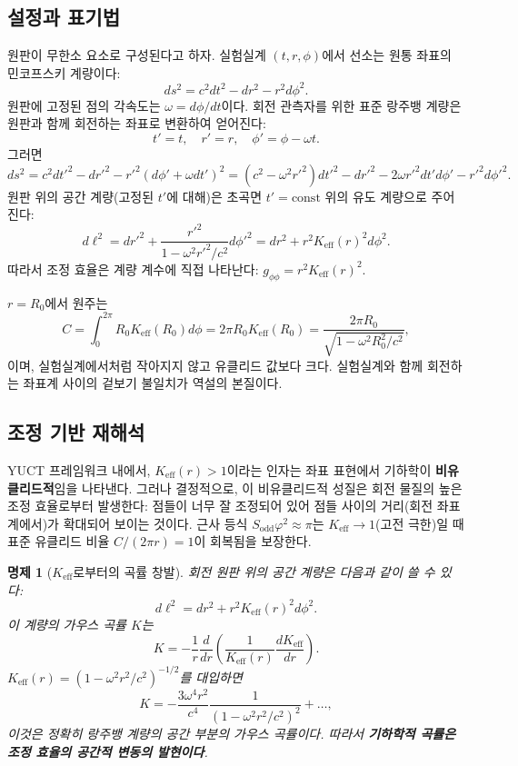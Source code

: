 \documentclass[12pt,a4paper]{article}
\newtheorem{proposition}{명제}[section]
\newcommand{\Sodd}{S_{\mathrm{odd}}}
\begin{document}
	\subsection{설정과 표기법}
	원판이 무한소 요소로 구성된다고 하자. 실험실계 \((t, r, \phi)\)에서 선소는 원통 좌표의 민코프스키 계량이다:
	\[
	ds^2 = c^2 dt^2 - dr^2 - r^2 d\phi^2.
	\]
	원판에 고정된 점의 각속도는 \(\omega = d\phi/dt\)이다. 회전 관측자를 위한 표준 랑주뱅 계량은 원판과 함께 회전하는 좌표로 변환하여 얻어진다:
	\[
	t' = t,\quad r' = r,\quad \phi' = \phi - \omega t.
	\]
	그러면
	\[
	ds^2 = c^2 dt'^2 - dr'^2 - r'^2 (d\phi' + \omega dt')^2 = (c^2 - \omega^2 r'^2) dt'^2 - dr'^2 - 2\omega r'^2 dt' d\phi' - r'^2 d\phi'^2.
	\]
	원판 위의 공간 계량(고정된 \(t'\)에 대해)은 초곡면 \(t' = \text{const}\) 위의 유도 계량으로 주어진다:
	\[
	d\ell^2 = dr'^2 + \frac{r'^2}{1 - \omega^2 r'^2/c^2} d\phi'^2 = dr^2 + r^2 K_{\mathrm{eff}}(r)^2 d\phi^2.
	\]
	따라서 조정 효율은 계량 계수에 직접 나타난다: \(g_{\phi\phi} = r^2 K_{\mathrm{eff}}(r)^2\).
	
	\(r = R_0\)에서 원주는
	\[
	C = \int_0^{2\pi} R_0 K_{\mathrm{eff}}(R_0) d\phi = 2\pi R_0 K_{\mathrm{eff}}(R_0) = \frac{2\pi R_0}{\sqrt{1 - \omega^2 R_0^2/c^2}},
	\]
	이며, 실험실계에서처럼 작아지지 않고 유클리드 값보다 크다. 실험실계와 함께 회전하는 좌표계 사이의 겉보기 불일치가 역설의 본질이다.
	
	\subsection{조정 기반 재해석}
	YUCT 프레임워크 내에서, \(K_{\mathrm{eff}}(r) > 1\)이라는 인자는 좌표 표현에서 기하학이 \textbf{비유클리드적}임을 나타낸다. 그러나 결정적으로, 이 비유클리드적 성질은 회전 물질의 높은 조정 효율로부터 발생한다: 점들이 너무 잘 조정되어 있어 점들 사이의 거리(회전 좌표계에서)가 확대되어 보이는 것이다. 근사 등식 \(\Sodd \varphi^2 \approx \pi\)는 \(K_{\mathrm{eff}} \to 1\)(고전 극한)일 때 표준 유클리드 비율 \(C/(2\pi r) = 1\)이 회복됨을 보장한다.
	
	\begin{proposition}[\(K_{\mathrm{eff}}\)로부터의 곡률 창발]
		회전 원판 위의 공간 계량은 다음과 같이 쓸 수 있다:
		\[
		d\ell^2 = dr^2 + r^2 K_{\mathrm{eff}}(r)^2 d\phi^2.
		\]
		이 계량의 가우스 곡률 \(K\)는
		\[
		K = -\frac{1}{r} \frac{d}{dr}\left( \frac{1}{K_{\mathrm{eff}}(r)} \frac{dK_{\mathrm{eff}}}{dr} \right).
		\]
		\(K_{\mathrm{eff}}(r) = (1 - \omega^2 r^2/c^2)^{-1/2}\)를 대입하면
		\[
		K = -\frac{3\omega^4 r^2}{c^4} \frac{1}{(1 - \omega^2 r^2/c^2)^2} + \dots,
		\]
		이것은 정확히 랑주뱅 계량의 공간 부분의 가우스 곡률이다. 따라서 \textbf{기하학적 곡률은 조정 효율의 공간적 변동의 발현이다}.
	\end{proposition}
	
\end{document}
